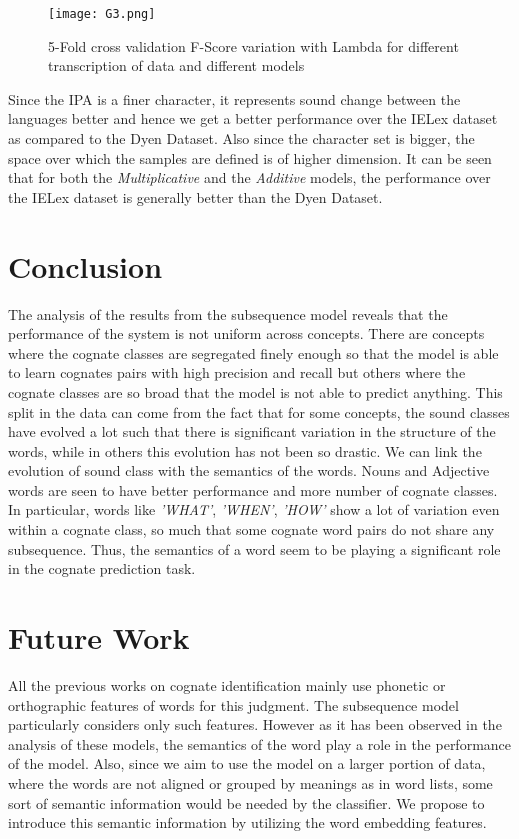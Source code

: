\documentclass[journal]{IEEEtran}
\begin{document}
\begin{figure}[h]
\centering
\texttt{[image: G3.png]}
\caption{5-Fold cross validation F-Score variation with Lambda for different transcription of data and different models}
\end{figure}

Since the IPA is a finer character, it represents sound change between the languages better and hence we get a better performance over the IELex dataset as compared to the Dyen Dataset. Also since the character set is bigger, the space over which the samples are defined is of higher dimension. It can be seen that for both the \textit{Multiplicative} and the \textit{Additive} models, the performance over the IELex dataset is generally better than the Dyen Dataset.

\section{Conclusion}

The analysis of the results from the subsequence model reveals that the performance of the system is not uniform across concepts. There are concepts where the cognate classes are segregated finely enough so that the model is able to learn cognates pairs with high precision and recall but others where the cognate classes are so broad that the model is not able to predict anything. This split in the data can come from the fact that for some concepts, the sound classes have evolved a lot such that there is significant variation in the structure of the words, while in others this evolution has not been so drastic. We can link the evolution of sound class with the semantics of the words. Nouns and Adjective words are seen to have better performance and more number of cognate classes. In particular, words like \textit{'WHAT'}, \textit{'WHEN'}, \textit{'HOW'} show a lot of variation even within a cognate class, so much that some cognate word pairs do not share any subsequence. Thus, the semantics of a word seem to be playing a significant role in the cognate prediction task.

\section{Future Work}
All the previous works on cognate identification mainly use phonetic or orthographic features of words for this judgment. The subsequence model particularly considers only such features. However as it has been observed in the analysis of these models, the semantics of the word play a role in the performance of the model. Also, since we aim to use the model on a larger portion of data, where the words are not aligned or grouped by meanings as in word lists, some sort of semantic information would be needed by the classifier. We propose to introduce this semantic information by utilizing the word embedding features. 
\end{document}
